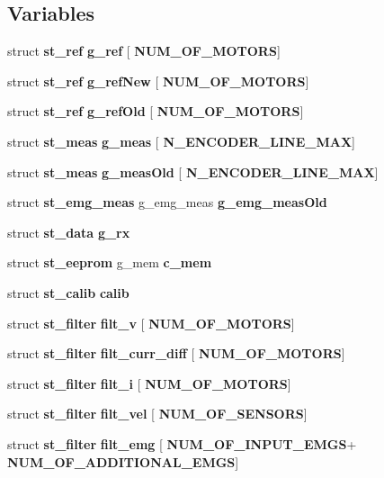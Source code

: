 \subsection*{Variables}
\begin{DoxyCompactItemize}
\item 
\mbox{\label{globals_8h_a975e5cde4f157d8bbdbde3c03227f3de}} 
struct \textbf{ st\+\_\+ref} {\bfseries g\+\_\+ref} [\textbf{ N\+U\+M\+\_\+\+O\+F\+\_\+\+M\+O\+T\+O\+RS}]
\item 
\mbox{\label{globals_8h_ab40c607c340b011a96046994f4b2229c}} 
struct \textbf{ st\+\_\+ref} {\bfseries g\+\_\+ref\+New} [\textbf{ N\+U\+M\+\_\+\+O\+F\+\_\+\+M\+O\+T\+O\+RS}]
\item 
struct \textbf{ st\+\_\+ref} \textbf{ g\+\_\+ref\+Old} [\textbf{ N\+U\+M\+\_\+\+O\+F\+\_\+\+M\+O\+T\+O\+RS}]
\item 
\mbox{\label{globals_8h_a6f0c00c1300c30d398231d1e76f3f780}} 
struct \textbf{ st\+\_\+meas} {\bfseries g\+\_\+meas} [\textbf{ N\+\_\+\+E\+N\+C\+O\+D\+E\+R\+\_\+\+L\+I\+N\+E\+\_\+\+M\+AX}]
\item 
struct \textbf{ st\+\_\+meas} \textbf{ g\+\_\+meas\+Old} [\textbf{ N\+\_\+\+E\+N\+C\+O\+D\+E\+R\+\_\+\+L\+I\+N\+E\+\_\+\+M\+AX}]
\item 
struct \textbf{ st\+\_\+emg\+\_\+meas} g\+\_\+emg\+\_\+meas \textbf{ g\+\_\+emg\+\_\+meas\+Old}
\item 
struct \textbf{ st\+\_\+data} \textbf{ g\+\_\+rx}
\item 
struct \textbf{ st\+\_\+eeprom} g\+\_\+mem \textbf{ c\+\_\+mem}
\item 
struct \textbf{ st\+\_\+calib} \textbf{ calib}
\item 
\mbox{\label{globals_8h_a0e9a576515332f8bd83ae6a2fe0164aa}} 
struct \textbf{ st\+\_\+filter} {\bfseries filt\+\_\+v} [\textbf{ N\+U\+M\+\_\+\+O\+F\+\_\+\+M\+O\+T\+O\+RS}]
\item 
\mbox{\label{globals_8h_a503852d956ef1e03f4a9d8b91db248fc}} 
struct \textbf{ st\+\_\+filter} {\bfseries filt\+\_\+curr\+\_\+diff} [\textbf{ N\+U\+M\+\_\+\+O\+F\+\_\+\+M\+O\+T\+O\+RS}]
\item 
struct \textbf{ st\+\_\+filter} \textbf{ filt\+\_\+i} [\textbf{ N\+U\+M\+\_\+\+O\+F\+\_\+\+M\+O\+T\+O\+RS}]
\item 
struct \textbf{ st\+\_\+filter} \textbf{ filt\+\_\+vel} [\textbf{ N\+U\+M\+\_\+\+O\+F\+\_\+\+S\+E\+N\+S\+O\+RS}]
\item 
struct \textbf{ st\+\_\+filter} \textbf{ filt\+\_\+emg} [\textbf{ N\+U\+M\+\_\+\+O\+F\+\_\+\+I\+N\+P\+U\+T\+\_\+\+E\+M\+GS}+\textbf{ N\+U\+M\+\_\+\+O\+F\+\_\+\+A\+D\+D\+I\+T\+I\+O\+N\+A\+L\+\_\+\+E\+M\+GS}]

\end{DoxyCompactItemize}
